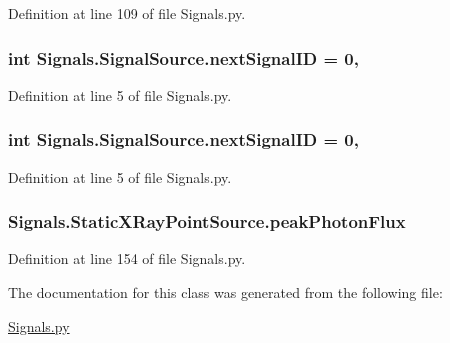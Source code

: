 Definition at line 109 of file Signals.\+py.

\subsubsection[{\texorpdfstring{next\+Signal\+ID}{nextSignalID}}]{\setlength{\rightskip}{0pt plus 5cm}int Signals.\+Signal\+Source.\+next\+Signal\+ID = 0\hspace{0.3cm}{\ttfamily [static]}, {\ttfamily [inherited]}}\hypertarget{classSignals_1_1SignalSource_abcff0d069f17cb5ebe3eff15b6283a64}{}\label{classSignals_1_1SignalSource_abcff0d069f17cb5ebe3eff15b6283a64}


Definition at line 5 of file Signals.\+py.

\subsubsection[{\texorpdfstring{next\+Signal\+ID}{nextSignalID}}]{\setlength{\rightskip}{0pt plus 5cm}int Signals.\+Signal\+Source.\+next\+Signal\+ID = 0\hspace{0.3cm}{\ttfamily [static]}, {\ttfamily [inherited]}}\hypertarget{classSignals_1_1SignalSource_abcff0d069f17cb5ebe3eff15b6283a64}{}\label{classSignals_1_1SignalSource_abcff0d069f17cb5ebe3eff15b6283a64}


Definition at line 5 of file Signals.\+py.

\subsubsection[{\texorpdfstring{peak\+Photon\+Flux}{peakPhotonFlux}}]{\setlength{\rightskip}{0pt plus 5cm}Signals.\+Static\+X\+Ray\+Point\+Source.\+peak\+Photon\+Flux}\hypertarget{classSignals_1_1StaticXRayPointSource_a7e16da6506ee1b83c9858dce9c7856ea}{}\label{classSignals_1_1StaticXRayPointSource_a7e16da6506ee1b83c9858dce9c7856ea}


Definition at line 154 of file Signals.\+py.



The documentation for this class was generated from the following file\+:\begin{DoxyCompactItemize}
\item 
\hyperlink{Signals_8py}{Signals.\+py}\end{DoxyCompactItemize}
